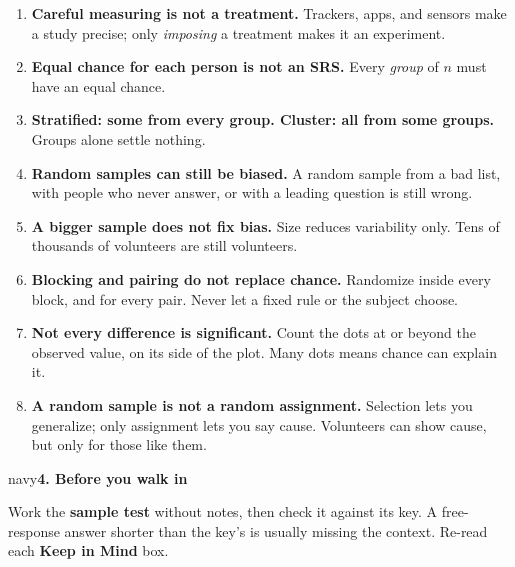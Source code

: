 \documentclass[12pt]{article}
\newcommand{\sghead}[2][10]{%
  \vspace{0.13in}
  \boxguard[#1]
  \begin{headlinebox}{navy}\color{white}\bfseries\small #2\end{headlinebox}
  \vspace{0.09in}}
\begin{document}
\small
\begin{enumerate}[leftmargin=1.6em, itemsep=2pt]
  \item \textbf{Careful measuring is not a treatment.} Trackers, apps, and sensors make a study
        precise; only \emph{imposing} a treatment makes it an experiment.
  \item \textbf{Equal chance for each person is not an SRS.} Every \emph{group} of $n$ must have
        an equal chance.
  \item \textbf{Stratified: some from every group. Cluster: all from some groups.} Groups alone
        settle nothing.
  \item \textbf{Random samples can still be biased.} A random sample from a bad list, with people
        who never answer, or with a leading question is still wrong.
  \item \textbf{A bigger sample does not fix bias.} Size reduces variability only. Tens of
        thousands of volunteers are still volunteers.
  \item \textbf{Blocking and pairing do not replace chance.} Randomize inside every block, and
        for every pair. Never let a fixed rule or the subject choose.
  \item \textbf{Not every difference is significant.} Count the dots at or beyond the observed
        value, on its side of the plot. Many dots means chance can explain it.
  \item \textbf{A random sample is not a random assignment.} Selection lets you generalize;
        only assignment lets you say cause. Volunteers can show cause, but only for those like
        them.
\end{enumerate}
\normalsize

\sghead[6]{4. Before you walk in}

\small
Work the \textbf{sample test} without notes, then check it against its key. A free-response
answer shorter than the key's is usually missing the context. Re-read each \textbf{Keep in Mind} box.
\normalsize
\end{document}
